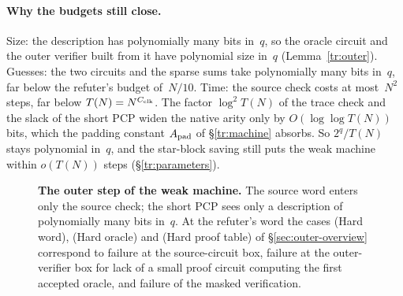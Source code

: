 \documentclass[11pt,letterpaper]{article}
\theoremstyle{definition}
\theoremstyle{remark}
\begin{document}
\paragraph{Why the budgets still close.} Size: the description has
polynomially many bits in~$q$, so the oracle circuit and the outer
verifier built from it have polynomial size in~$q$
(Lemma~\ref{tr:outer}). Guesses: the two circuits and the sparse sums
take polynomially many bits in~$q$, far below the refuter's budget
of~$N/10$. Time: the source check costs at most~$N^2$ steps, far below
$T(N)=N^{C_{\rm clk}}$. The factor $\log^2T(N)$ of the trace check and
the slack of the short PCP widen the native arity only by
$O(\log\log T(N))$ bits, which the padding constant $A_{\rm pad}$
of \S\ref{tr:machine} absorbs. So
$2^q/T(N)$ stays polynomial in~$q$, and the star-block saving still puts
the weak machine within $o(T(N))$ steps (\S\ref{tr:parameters}).

\begin{figure}[tp]
\centering
{}
\caption{\textbf{The outer step of the weak machine.} The source word
enters only the source check; the short PCP sees only a description of
polynomially many bits in~$q$. At the refuter's word the cases (Hard
word), (Hard oracle) and (Hard proof table) of
\S\ref{sec:outer-overview} correspond to failure at the source-circuit
box, failure at the outer-verifier box for lack of a small proof
circuit computing the first accepted oracle, and failure of the masked
verification.}
\label{fig:outer}
\end{figure}
\end{document}

